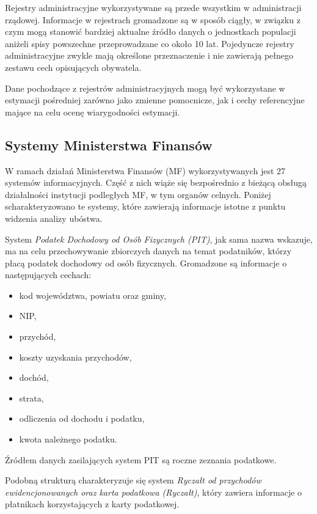 Rejestry administracyjne wykorzystywane są przede wszystkim w administracji rządowej. Informacje w rejestrach gromadzone są w sposób ciągły, w związku z czym mogą stanowić bardziej aktualne źródło danych o jednostkach populacji aniżeli spisy powszechne przeprowadzane co około 10 lat. Pojedyncze rejestry administracyjne zwykle mają określone przeznaczenie i nie zawierają pełnego zestawu cech opisujących obywatela.

Dane pochodzące z rejestrów administracyjnych mogą być wykorzystane w estymacji pośredniej zarówno jako zmienne pomocnicze, jak i cechy referencyjne mające na celu ocenę wiarygodności estymacji.

\subsection{Systemy Ministerstwa Finansów}

W ramach działań Ministerstwa Finansów (MF) wykorzystywanych jest 27 systemów informacyjnych. Część z nich wiąże się bezpośrednio z bieżącą obsługą działalności instytucji podległych MF, w tym organów celnych. Poniżej scharakteryzowano te systemy, które zawierają informacje istotne z punktu widzenia analizy ubóstwa. 

System \textit{Podatek Dochodowy od Osób Fizycznych (PIT)}, jak sama nazwa wskazuje, ma na celu przechowywanie zbiorczych danych na temat podatników, którzy płacą podatek dochodowy od osób fizycznych. Gromadzone są informacje o następujących cechach:

\begin{itemize}
\item kod województwa, powiatu oraz gminy,
\item NIP,
\item przychód,
\item koszty uzyskania przychodów,
\item dochód,
\item strata,
\item odliczenia od dochodu i podatku,
\item kwota należnego podatku.
\end{itemize}

Źródłem danych zasilających system PIT są roczne zeznania podatkowe.

Podobną strukturą charakteryzuje się system \textit{Ryczałt od przychodów ewidencjonowanych oraz karta podatkowa (Ryczałt)}, który zawiera informacje o płatnikach korzystających z karty podatkowej. 

